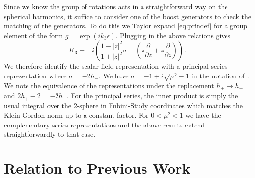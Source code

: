 \documentclass{brownthesis}
\begin{document}
Since we know the group of rotations acts in a straightforward way
on the spherical harmonics, it suffice to consider one of the boost
generators to check the matching of the generators. To do this we
Taylor expand \eqref{eq:prindef} for a group element of the form
$g=\exp(ik_{3}\epsilon)$. Plugging in the above relations gives
\[
K_{3}=-i\left(\frac{1-|z|^{2}}{1+|z|^{2}}\sigma-\left(z\frac{\partial}{\partial z}+\bar{z}\frac{\partial}{\partial\bar{z}}\right)\right)\,.
\]
We therefore identify the scalar field representation with a principal
series representation where $\sigma=-2h_{-}$. We have $\sigma=-1+i\sqrt{\mu^{2}-1}$
in the notation of \cite{vilenkin1992representation}. We note the
equivalence of the representations under the replacement $h_{+}\to h_{-}$
and $2h_{+}-2=-2h_{-}$. For the principal series, the inner product
is simply the usual integral over the 2-sphere in Fubini-Study coordinates
which matches the Klein-Gordon norm up to a constant factor. For $0<\mu^{2}<1$
we have the complementary series representations and the above results
extend straightforwardly to that case.

\section{Relation to Previous Work}

\label{sec:psrep}
\end{document}
